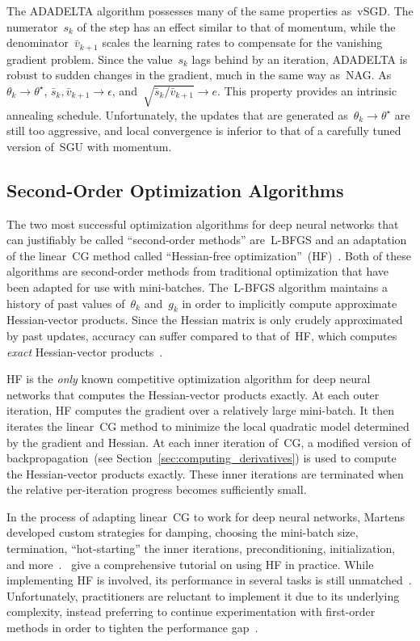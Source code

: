 \documentclass[11pt,a4paper]{article}
\numberwithin{equation}{section}
\begin{document}
The ADADELTA algorithm possesses many of the same properties as~vSGD. The
numerator~$s_k$ of the step has an effect similar to that of momentum, while the
denominator~$\bar{v}_{k + 1}$ scales the learning rates to compensate for the
vanishing gradient problem. Since the value~$s_k$ lags behind by an iteration,
ADADELTA is robust to sudden changes in the gradient, much in the same way
as~NAG. As $\theta_k \to \theta^\star$, $\bar{s}_k, \bar{v}_{k + 1} \to
\epsilon$, and~$\sqrt{\bar{s}_k / \bar{v}_{k + 1}} \to e$. This property
provides an intrinsic annealing schedule. Unfortunately, the updates that are
generated as~$\theta_k \to \theta^\star$ are still too aggressive, and local
convergence is inferior to that of a carefully tuned version of~SGU with
momentum.

\subsection{Second-Order Optimization Algorithms}
\label{sec:second_order_alg}

The two most successful optimization algorithms for deep neural networks that
can justifiably be called ``second-order methods'' are~L-BFGS and an adaptation
of the linear~CG method called ``Hessian-free
optimization''~(HF)~\citep{martens2010deep}. Both of these algorithms are
second-order methods from traditional optimization that have been adapted for
use with mini-batches. The~L-BFGS algorithm maintains a history of past values
of~$\theta_k$ and~$g_k$ in order to implicitly compute approximate
Hessian-vector products. Since the Hessian matrix is only crudely approximated
by past updates, accuracy can suffer compared to that of~HF, which computes
\emph{exact} Hessian-vector products~\citep{ngiam2011optimization}.

HF is the \emph{only} known competitive optimization algorithm for deep neural
networks that computes the Hessian-vector products exactly. At each outer
iteration, HF computes the gradient over a relatively large mini-batch. It then
iterates the linear~CG method to minimize the local quadratic model determined
by the gradient and Hessian. At each inner iteration of~CG, a modified version
of backpropagation~(see Section~\ref{sec:computing_derivatives}) is used to
compute the Hessian-vector products exactly. These inner iterations are
terminated when the relative per-iteration progress becomes sufficiently small.

In the process of adapting linear~CG to work for deep neural networks, Martens
developed custom strategies for damping, choosing the mini-batch size,
termination, ``hot-starting'' the inner iterations, preconditioning,
initialization, and more~\citep{martens2010deep}. \citep{martens-hf-guide}~give
a comprehensive tutorial on using HF in practice. While implementing HF is
involved, its performance in several tasks is still
unmatched~\citep{martens2010deep, ngiam2011optimization,
sutskever2013importance}. Unfortunately, practitioners are reluctant to
implement it due to its underlying complexity, instead preferring to continue
experimentation with first-order methods in order to tighten the performance
gap~\citep{sutskever2013importance}.
\end{document}
